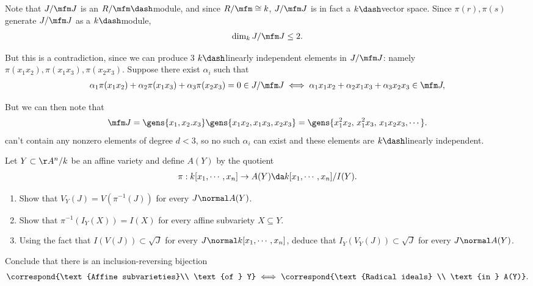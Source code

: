 \begin{solution}
\begin{claim}
\hfill\break
Note that \(J/\mfm J\) is an \(R/\mfm\dash\)module, and since
\(R/\mfm \cong k\), \(J/\mfm J\) is in fact a \(k\dash\)vector space.
Since \(\pi(r), \pi(s)\) generate \(J/\mfm J\) as a \(k\dash\)module,
\begin{align*}\dim_k J/\mfm J \leq 2.\end{align*}

\hfill\break
But this is a contradiction, since we can produce 3 \(k\dash\)linearly
independent elements in \(J/\mfm J\): namely
\(\pi(x_1 x_2), \pi(x_1 x_3), \pi(x_2 x_3)\). Suppose there exist
\(\alpha_i\) such that
\begin{align*}  
\alpha_1 \pi(x_1 x_2) + \alpha_2 \pi(x_1 x_3) + \alpha_3 \pi(x_2 x_3) = 0 \in J/\mfm J \iff
\alpha_1 x_1 x_2 + \alpha_2 x_1 x_3 + \alpha_3 x_2 x_3 \in \mfm J
,\end{align*}

But we can then note that
\begin{align*}  
\mfm J = \gens{x_1, x_2. x_3}\gens{x_1 x_2, x_1 x_3, x_2 x_3} = 
\gens{x_1^2 x_2,\, x_1^2 x_3,\, x_1x_2 x_3, \cdots}
.\end{align*} can't contain any nonzero elements of degree \(d<3\), so
no such \(\alpha_i\) can exist and these elements are \(k\dash\)linearly
independent.

\end{claim}

\end{solution}

\begin{exercise}

Let \(Y\subset \AA^n/k\) be an affine variety and define \(A(Y)\) by the
quotient
\begin{align*}  
\pi: k[x_1,\cdots, x_n] \to A(Y) \da k[x_1, \cdots, x_n]/I(Y)
.\end{align*}

\begin{enumerate}
\def\labelenumi{\alph{enumi}.}
\item
  Show that \(V_Y(J) = V(\pi^{-1}(J))\) for every \(J\normal A(Y)\).
\item
  Show that \(\pi^{-1} (I_Y(X)) = I(X)\) for every affine subvariety
  \(X\subseteq Y\).
\item
  Using the fact that \(I(V(J)) \subset \sqrt{J}\) for every
  \(J\normal k[x_1, \cdots, x_n]\), deduce that
  \(I_Y(V_Y(J)) \subset \sqrt{J}\) for every \(J\normal A(Y)\).
\end{enumerate}

Conclude that there is an inclusion-reversing bijection
\begin{align*}  
  \correspond{\text{Affine subvarieties}\\ \text{of } Y} \iff \correspond{\text{Radical ideals} \\ \text{in } A(Y)}
  .\end{align*}

\end{exercise}


